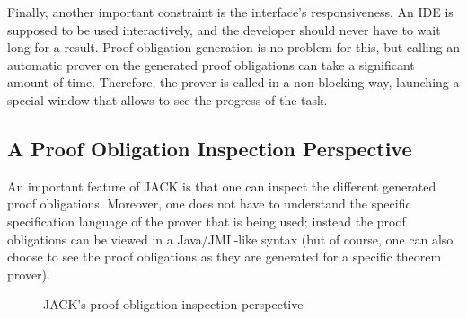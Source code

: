 Finally, another important constraint is the interface's
responsiveness. An IDE is supposed to be used interactively, and the
developer should never have to wait long for a result. Proof
obligation generation is no problem for this, but calling an automatic
prover on the generated proof obligations can take a significant
amount of time. Therefore, the prover is called in a non-blocking way,
launching a special window that allows to see the progress of the
task.

\subsection{A Proof Obligation Inspection Perspective}

An important feature of JACK is that one can inspect the different
generated proof obligations. Moreover, one does not have to understand
the specific specification language of the prover that is being used;
instead the proof obligations can be viewed in a Java/JML-like syntax
(but of course, one can also choose to see the proof obligations as
they are generated for a specific theorem prover).

\begin{figure}[t!]
\caption{JACK's proof obligation inspection perspective}\label{FigJackPerspective}
\end{figure}


